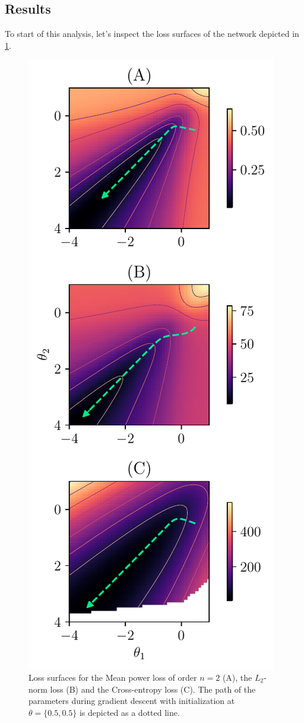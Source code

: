 \subsection{Results}\label{sec:ResultsOf2ParameterNetwork}
To start of this analysis, let's inspect the loss surfaces of the network depicted in \cref{fig:Results2LossSurfaces}.
\begin{figure}
	\centering
	\includegraphics{Experiment2/plots/LossSurfaces.pdf}
	\caption{Loss surfaces for the Mean power loss of order $n=2$ (A), the $L_2$-norm loss (B) and the Cross-entropy loss (C). The path of the parameters during gradient descent with initialization at $\theta = \{0.5, 0.5\}$ is depicted as a dotted line.}
	\label{fig:Results2LossSurfaces}
\end{figure}
